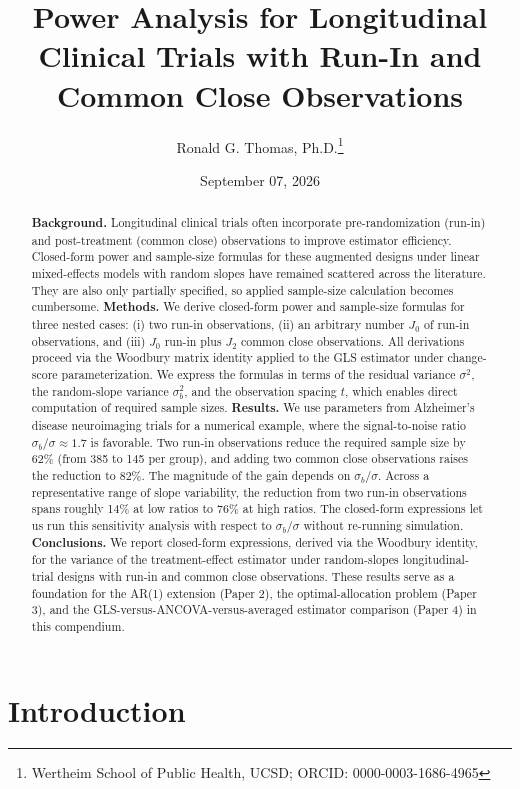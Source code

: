 \documentclass[
  11pt,
]{article}
\title{Power Analysis for Longitudinal Clinical Trials
with Run-In and Common Close Observations}
\author{Ronald G. Thomas, Ph.D.\thanks{Wertheim School of Public Health, UCSD; ORCID: 0000-0003-1686-4965}}
\date{September 07, 2026}
\begin{document}
\maketitle
\begin{abstract}
\textbf{Background.} Longitudinal clinical trials often
incorporate pre-randomization (run-in) and post-treatment
(common close) observations to improve estimator efficiency.
Closed-form power and sample-size formulas for these
augmented designs under linear mixed-effects models with
random slopes have remained scattered across the literature.
They are also only partially specified, so applied
sample-size calculation becomes cumbersome.
\textbf{Methods.} We derive closed-form power and sample-size
formulas for three nested cases: (i) two run-in observations,
(ii) an arbitrary number \(J_0\) of run-in observations, and
(iii) \(J_0\) run-in plus \(J_2\) common close observations. All
derivations proceed via the Woodbury matrix identity applied
to the GLS estimator under change-score parameterization.
We express the formulas in terms of the residual variance
\(\sigma^2\), the random-slope variance \(\sigma_b^2\), and the
observation spacing \(t\), which enables direct computation of
required sample sizes.
\textbf{Results.} We use parameters from Alzheimer's disease
neuroimaging trials for a numerical example, where the
signal-to-noise ratio \(\sigma_b / \sigma \approx 1.7\) is
favorable. Two run-in observations reduce the required
sample size by 62\% (from 385 to 145 per group), and adding
two common close observations raises the reduction to 82\%.
The magnitude of the gain depends on \(\sigma_b / \sigma\).
Across a representative range of slope variability, the
reduction from two run-in observations spans roughly 14\% at
low ratios to 76\% at high ratios. The closed-form
expressions let us run this sensitivity analysis with
respect to \(\sigma_b / \sigma\) without re-running simulation.
\textbf{Conclusions.} We report closed-form expressions, derived
via the Woodbury identity, for the variance of the
treatment-effect estimator under random-slopes
longitudinal-trial designs with run-in and common close
observations. These results serve as a foundation for the
AR(1) extension (Paper 2), the optimal-allocation problem
(Paper 3), and the GLS-versus-ANCOVA-versus-averaged
estimator comparison (Paper 4) in this compendium.
\end{abstract}

{
\setcounter{tocdepth}{2}
\tableofcontents
}
\section{Introduction}\label{introduction}
\end{document}
